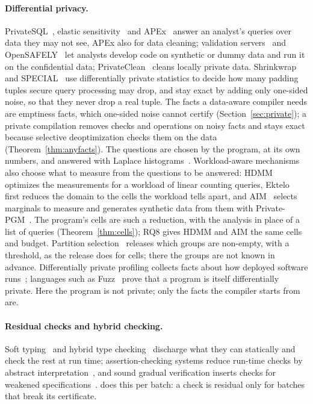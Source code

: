 \paragraph{Differential privacy.} PrivateSQL~\cite{kotsogiannis2019}, elastic
sensitivity~\cite{johnson2018} and APEx~\cite{ge2019} answer an analyst's queries over data they may
not see, APEx also for data cleaning; validation servers~\cite{barrientos2018} and
OpenSAFELY~\cite{williamson2020} let analysts develop code on synthetic or dummy data and run it on the
confidential data; PrivateClean~\cite{krishnan2016} cleans locally private data. Shrinkwrap~\cite{bater2018}
and SPECIAL~\cite{wang2024special} use differentially private statistics to decide how many padding
tuples secure query processing may drop, and stay exact by adding only one-sided noise, so that they never
drop a real tuple. The facts a data-aware compiler needs are emptiness facts, which one-sided noise
cannot certify (Section~\ref{sec:private}); a private compilation removes checks and operations on noisy
facts and stays exact because selective deoptimization checks them on the data
(Theorem~\ref{thm:anyfacts}). The questions are chosen by the program, at its own numbers, and answered
with Laplace histograms~\cite{dwork2014}. Workload-aware mechanisms also choose what to measure from the
questions to be answered: HDMM~\cite{mckenna2018hdmm} optimizes the measurements for a workload of linear
counting queries, Ektelo~\cite{zhang2018ektelo} first reduces the domain to the cells the workload tells
apart, and AIM~\cite{mckenna2022aim} selects marginals to measure and generates synthetic data from them
with Private-PGM~\cite{mckenna2019pgm}. The program's cells are such a reduction, with the analysis in
place of a list of queries (Theorem~\ref{thm:cells}); RQ8 gives HDMM and AIM the same cells and budget.
Partition selection~\cite{desfontaines2022partition} releases which groups are non-empty, with a
threshold, as the release does for cells; there the groups are not known in advance. Differentially
private profiling collects facts about how deployed
software runs~\cite{zhang2020profiling}; languages such as Fuzz~\cite{reed2010} prove that a program is
itself differentially private. Here the program is not private; only the facts the compiler starts from
are.

\paragraph{Residual checks and hybrid checking.} Soft typing~\cite{cartwright1991} and hybrid type
checking~\cite{flanagan2006} discharge what they can statically and check the rest at run time;
assertion-checking systems reduce run-time checks by abstract interpretation~\cite{stulova2018}, and
sound gradual verification inserts checks for weakened specifications~\cite{zimmerman2024}. \PL does
this per batch: a check is residual only for batches that break its certificate.

